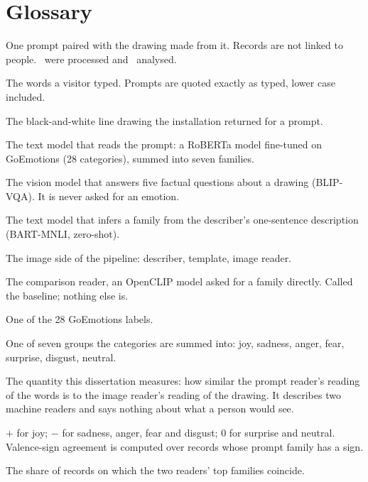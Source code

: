 \chapter{Glossary}
\label{app:glossary}


\begin{description}\setlength{\itemsep}{2pt}
\item[Record] One prompt paired with the drawing made from it. Records are not linked to people. \nTotal\ were processed and \nAnalysed\ analysed.
\item[Prompt] The words a visitor typed. Prompts are quoted exactly as typed, lower case included.
\item[Drawing] The black-and-white line drawing the installation returned for a prompt.
\item[Prompt reader] The text model that reads the prompt: a RoBERTa model fine-tuned on GoEmotions (28 categories), summed into seven families.
\item[Describer] The vision model that answers five factual questions about a drawing (BLIP-VQA). It is never asked for an emotion.
\item[Image reader] The text model that infers a family from the describer's one-sentence description (BART-MNLI, zero-shot).
\item[Describe-then-extract] The image side of the pipeline: describer, template, image reader.
\item[Direct CLIP] The comparison reader, an OpenCLIP model asked for a family directly. Called the baseline; nothing else is.
\item[Category] One of the 28 GoEmotions labels.
\item[Family] One of seven groups the categories are summed into: joy, sadness, anger, fear, surprise, disgust, neutral.
\item[Agreement] The quantity this dissertation measures: how similar the prompt reader's reading of the words is to the image reader's reading of the drawing. It describes two machine readers and says nothing about what a person would see.
\item[Valence sign] $+$ for joy; $-$ for sadness, anger, fear and disgust; $0$ for surprise and neutral. Valence-sign agreement is computed over records whose prompt family has a sign.
\item[Family agreement] The share of records on which the two readers' top families coincide.

\end{description}
